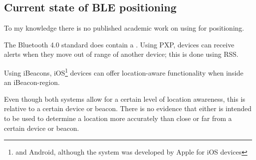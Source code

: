 \subsection{Current state of BLE positioning}
To my knowledge there is no published academic work on using \BLE for positioning.

The Bluetooth 4.0 standard does contain a .
Using PXP, devices can receive alerts when they move out of range of another device; this is done using RSS.

Using iBeacons, iOS\footnote{and Android, although the system was developed by Apple for iOS devices} devices can offer location-aware functionality when inside an iBeacon-region.

Even though both systems allow for a certain level of location awareness, this is relative to a certain device or beacon.
There is no evidence that either is intended to be used to determine a location more accurately than close or far from a certain device or beacon.

